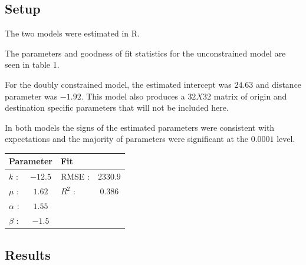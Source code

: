 \documentclass[11pt]{article} %
\begin{document}
\subsection{Setup}

The two models were estimated in R. 

The parameters and goodness of fit statistics for the unconstrained model are seen in table 1. 

For the doubly constrained model, the estimated intercept was $24.63$ and distance parameter was $-1.92$. This model also produces a $32 X 32 $ matrix of origin and destination specific parameters that will not be included here. 

In both models the signs of the estimated parameters were consistent with expectations and the majority of parameters were significant at the $0.0001$ level.

\begin{center}
\begin{tabular}{lclc}
 \multicolumn{2}{l}{Parameter} 	& \multicolumn{2}{l}{Fit } \\ \hline	 
 $k$ : 		& $-12.5$ 	& RMSE :	&  $2330.9$	  	\\
 $\mu$ :	& $1.62$	& $R^2$ :	&  	$0.386$  	\\
 $\alpha$ :	& $1.55$	&  			&  	  			\\
 $\beta$ :	& $-1.5$	& 	 		&
\end{tabular}
\label{unconstrained}
\end{center} 


\subsection{Results}

\begin{table}
\tiny
{}
\end{table}

\begin{table}
\tiny
{}
\end{table}

\begin{table}
\tiny
{}
\end{table}
\end{document}
